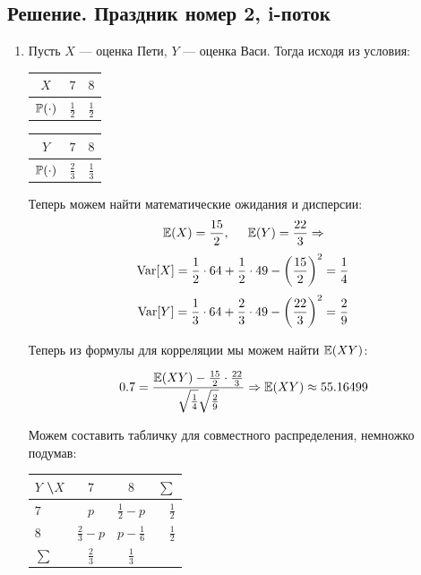 \documentclass[12pt, a4paper]{article}\usepackage[]{graphicx}\usepackage[]{color}
\begin{document}
\subsection{Решение. Праздник номер 2, i-поток}

\begin{enumerate}
\item
Пусть $X$ — оценка Пети, $Y$ — оценка Васи. Тогда исходя из условия:
\begin{center}

\begin{tabular}{ccc}
\toprule
$X$ & $7$ & $8$ \\ \midrule
$\P(\cdot)$ & $\frac{1}{2}$ & $\frac{1}{2}$ \\ \bottomrule
\end{tabular}
\hspace{1cm}
\begin{tabular}{ccc}
\toprule
$Y$ & $7$ & $8$ \\ \midrule
$\P(\cdot)$ & $\frac{2}{3}$ & $\frac{1}{3}$  \\ \bottomrule
\end{tabular}
\end{center}

Теперь можем найти математические ожидания и дисперсии:
\[
\E(X) = \frac{15}{2}, \hspace{0.5cm} \E(Y) = \frac{22}{3} \Rightarrow
\]
\[
\Var[X] = \frac{1}{2}\cdot 64 + \frac{1}{2}\cdot 49 - \left(\frac{15}{2}\right)^2 = \frac{1}{4}
\]
\[
\Var[Y] = \frac{1}{3}\cdot 64 + \frac{2}{3}\cdot 49 - \left(\frac{22}{3}\right)^2 = \frac{2}{9}
\]

Теперь из формулы для корреляции мы можем найти $\E(XY)$:

\[
0.7 = \frac{\E(XY)-\frac{15}{2}\cdot\frac{22}{3}}{\sqrt{\frac{1}{4}}\sqrt{\frac{2}{9}}} \Rightarrow \E(XY) \approx 55.16499
\]

Можем составить табличку для совместного распределения, немножко подумав:

\begin{center}
\begin{tabular}{@{}lccr@{}}
\toprule
$Y$ \textbackslash $X$ & $7$             & $8$             & $\sum$        \\ \midrule
$7$                              & $p$             & $\frac{1}{2}-p$ & $\frac{1}{2}$ \\
$8$                              & $\frac{2}{3}-p$ & $p-\frac{1}{6}$ & $\frac{1}{2}$ \\
$\sum$                           & $\frac{2}{3}$   & $\frac{1}{3}$   &               \\ \bottomrule
\end{tabular}
\end{center}


\end{enumerate}
\end{document}
